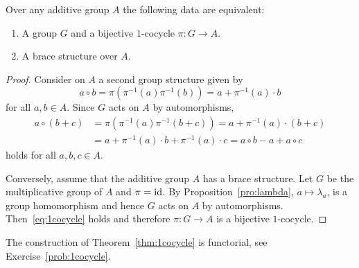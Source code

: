 \begin{theorem}
	\label{thm:1cocycle}
    Over any additive group $A$ the following data are equivalent:
    \begin{enumerate}
        \item A group $G$ and a bijective
            $1$-cocycle $\pi\colon G\to A$. 
        \item A brace structure over $A$. 
    \end{enumerate}

    \begin{proof}
        Consider on $A$ a second group structure given by 
        \[
		a\circ b=\pi(\pi^{-1}(a)\pi^{-1}(b))=a+\pi^{-1}(a)\cdot b
		\]
		for all
        $a,b\in A$.  Since $G$ acts on $A$ by
        automorphisms, 
        \begin{align*}
            a\circ (b+c)&=\pi(\pi^{-1}(a)\pi^{-1}(b+c))=a+\pi^{-1}(a)\cdot (b+c)\\
            &=a+ \pi^{-1}(a)\cdot b+\pi^{-1}(a)\cdot c
            =a\circ b-a+a\circ c
        \end{align*}
        holds for all $a,b,c\in A$.
        
        Conversely, assume that the additive group $A$ has a brace structure. Let $G$ be the multiplicative group of $A$
        and $\pi=\operatorname{id}$. By
        Proposition~\ref{pro:lambda}, $a\mapsto\lambda_a$, is a group homomorphism and 
        hence $G$ acts on $A$ by automorphisms. Then~\eqref{eq:1cocycle} holds
        and therefore $\pi\colon G\to A$ is a bijective $1$-cocycle. 
    \end{proof}
\end{theorem}

The construction of Theorem~\ref{thm:1cocycle} is functorial, see Exercise~\ref{prob:1cocycle}.






